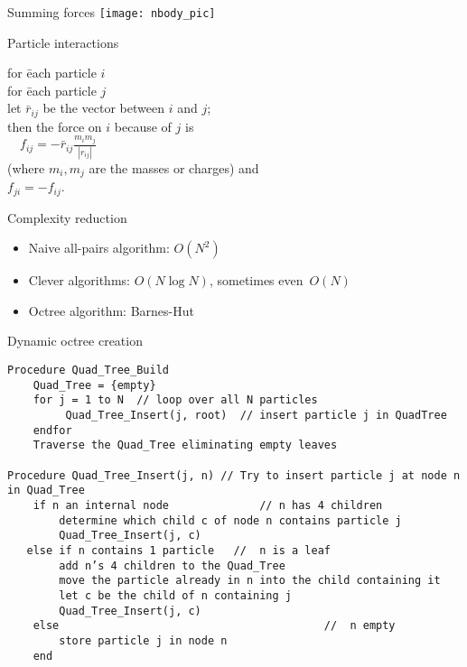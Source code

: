 
\begin{frame}{Summing forces}
  \texttt{[image: nbody\_pic]}
\end{frame}

\begin{frame}{Particle interactions}
  \begin{tabbing}
    for \=each particle $i$\\
    \>for \= each particle $j$\\
    \>\> let $\bar r_{ij}$ be the vector between $i$ and $j$;\\
    \>\> then the force on $i$ because of $j$ is\\
    \>\> $\quad f_{ij} = -\bar r_{ij}\frac{m_im_j}{|r_{ij}|}$\\
    \>\> (where $m_i,m_j$ are the masses or charges) and\\
    \>\> $f_{ji}=-f_{ij}$.
  \end{tabbing}
\end{frame}

\begin{frame}{Complexity reduction}
  \begin{itemize}
  \item Naive all-pairs algorithm: $O(N^2)$
  \item Clever algorithms: $O(N\log N)$, sometimes even~$O(N)$
  \item Octree algorithm: Barnes-Hut
  \end{itemize}  
\end{frame}

\begin{frame}[fragile]{Dynamic octree creation}
\small
\begin{verbatim}
Procedure Quad_Tree_Build
    Quad_Tree = {empty}
    for j = 1 to N  // loop over all N particles
         Quad_Tree_Insert(j, root)  // insert particle j in QuadTree
    endfor
    Traverse the Quad_Tree eliminating empty leaves

Procedure Quad_Tree_Insert(j, n) // Try to insert particle j at node n in Quad_Tree
    if n an internal node              // n has 4 children
        determine which child c of node n contains particle j
        Quad_Tree_Insert(j, c)
   else if n contains 1 particle   //  n is a leaf
        add n’s 4 children to the Quad_Tree
        move the particle already in n into the child containing it
        let c be the child of n containing j
        Quad_Tree_Insert(j, c)
    else                                         //  n empty 
        store particle j in node n
    end
\end{verbatim}
\end{frame}

